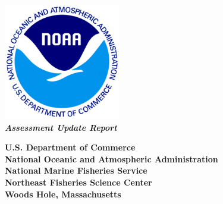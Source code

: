 \begin{titlingpage}
\begin{center}
\includegraphics[height=2in,keepaspectratio=true]{./NOAA_Transparent_Logo.png}
\vfill
\huge{\textbf{\SPPname{}}} \\
\vfill
\huge{\textit{\textbf{ \the\year{} Assessment Update Report}}}
\vspace*{\fill}

\large{\textbf{U.S. Department of Commerce\\
National Oceanic and Atmospheric Administration\\
National Marine Fisheries Service\\
Northeast Fisheries Science Center\\
Woods Hole, Massachusetts\\}
\vspace*{\fill}
\textbf{\monthname{}  \the\year{}}}
\end{center}
\end{titlingpage}
